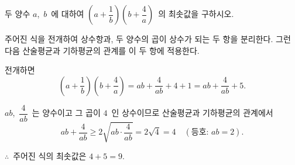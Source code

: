 \documentclass[10pt]{article}
\begin{document}
\newpage


\begin{dmproblem}
두 양수 $a$,\ $b$\ 에 대하여 $\left(a + \dfrac{1}{b}\right)\!\left(b + \dfrac{4}{a}\right)$\ 의 최솟값을 구하시오.
\end{dmproblem}

\begin{dmapproach}
주어진 식을 전개하여 상수항과, 두 양수의 곱이 상수가 되는 두 항을 분리한다. 그런 다음 산술평균과 기하평균의 관계를 이 두 항에 적용한다.
\end{dmapproach}

\begin{dmsolution}
전개하면
\[ \left(a + \frac{1}{b}\right)\!\left(b + \frac{4}{a}\right) = ab + \frac{4}{ab} + 4 + 1 = ab + \frac{4}{ab} + 5. \]

$ab$,\ $\dfrac{4}{ab}$\ 는 양수이고 그 곱이 $4$\ 인 상수이므로 산술평균과 기하평균의 관계에서
\[ ab + \frac{4}{ab} \ge 2\sqrt{ab \cdot \frac{4}{ab}} = 2\sqrt{4} = 4 \quad (\text{등호: } ab = 2). \]

$\therefore$\ 주어진 식의 최솟값은 $4 + 5 = 9$.
\end{dmsolution}

\dmchecktitle



\newpage


\end{document}
